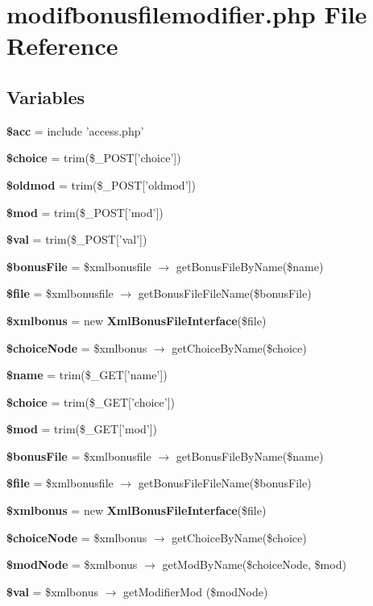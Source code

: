 \section{modifbonusfilemodifier.php File Reference}
\label{modifbonusfilemodifier_8php}


\subsection*{Variables}
\begin{CompactItemize}
\item 
{\bf \$acc} = include 'access.php'
\item 
{\bf \$choice} = trim(\$\_\-POST['choice'])
\item 
{\bf \$oldmod} = trim(\$\_\-POST['oldmod'])
\item 
{\bf \$mod} = trim(\$\_\-POST['mod'])
\item 
{\bf \$val} = trim(\$\_\-POST['val'])
\item 
{\bf \$bonus\-File} = \$xmlbonusfile $\rightarrow$ get\-Bonus\-File\-By\-Name(\$name)
\item 
{\bf \$file} = \$xmlbonusfile $\rightarrow$ get\-Bonus\-File\-File\-Name(\$bonus\-File)
\item 
{\bf \$xmlbonus} = new {\bf Xml\-Bonus\-File\-Interface}(\$file)
\item 
{\bf \$choice\-Node} = \$xmlbonus $\rightarrow$ get\-Choice\-By\-Name(\$choice)
\item 
{\bf \$name} = trim(\$\_\-GET['name'])
\item 
{\bf \$choice} = trim(\$\_\-GET['choice'])
\item 
{\bf \$mod} = trim(\$\_\-GET['mod'])
\item 
{\bf \$bonus\-File} = \$xmlbonusfile $\rightarrow$ get\-Bonus\-File\-By\-Name(\$name)
\item 
{\bf \$file} = \$xmlbonusfile $\rightarrow$ get\-Bonus\-File\-File\-Name(\$bonus\-File)
\item 
{\bf \$xmlbonus} = new {\bf Xml\-Bonus\-File\-Interface}(\$file)
\item 
{\bf \$choice\-Node} = \$xmlbonus $\rightarrow$ get\-Choice\-By\-Name(\$choice)
\item 
{\bf \$mod\-Node} = \$xmlbonus $\rightarrow$ get\-Mod\-By\-Name(\$choice\-Node, \$mod)
\item 
{\bf \$val} = \$xmlbonus $\rightarrow$ get\-Modifier\-Mod (\$mod\-Node)
\end{CompactItemize}


